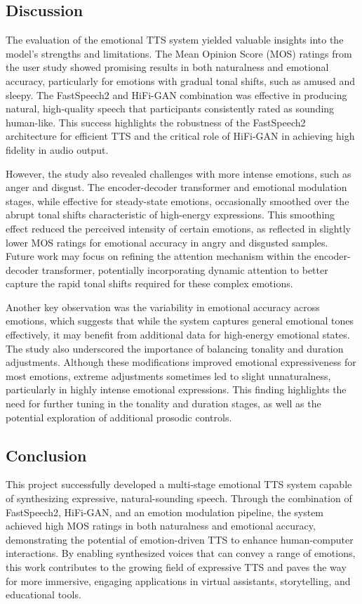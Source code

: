 \subsection{Discussion}
The evaluation of the emotional TTS system yielded valuable insights into the model’s strengths and limitations. The Mean Opinion Score (MOS) ratings from the user study showed promising results in both naturalness and emotional accuracy, particularly for emotions with gradual tonal shifts, such as amused and sleepy. The FastSpeech2 and HiFi-GAN combination was effective in producing natural, high-quality speech that participants consistently rated as sounding human-like. This success highlights the robustness of the FastSpeech2 architecture for efficient TTS and the critical role of HiFi-GAN in achieving high fidelity in audio output.

However, the study also revealed challenges with more intense emotions, such as anger and disgust. The encoder-decoder transformer and emotional modulation stages, while effective for steady-state emotions, occasionally smoothed over the abrupt tonal shifts characteristic of high-energy expressions. This smoothing effect reduced the perceived intensity of certain emotions, as reflected in slightly lower MOS ratings for emotional accuracy in angry and disgusted samples. Future work may focus on refining the attention mechanism within the encoder-decoder transformer, potentially incorporating dynamic attention to better capture the rapid tonal shifts required for these complex emotions.

Another key observation was the variability in emotional accuracy across emotions, which suggests that while the system captures general emotional tones effectively, it may benefit from additional data for high-energy emotional states. The study also underscored the importance of balancing tonality and duration adjustments. Although these modifications improved emotional expressiveness for most emotions, extreme adjustments sometimes led to slight unnaturalness, particularly in highly intense emotional expressions. This finding highlights the need for further tuning in the tonality and duration stages, as well as the potential exploration of additional prosodic controls.

\subsection{Conclusion}
This project successfully developed a multi-stage emotional TTS system capable of synthesizing expressive, natural-sounding speech. Through the combination of FastSpeech2, HiFi-GAN, and an emotion modulation pipeline, the system achieved high MOS ratings in both naturalness and emotional accuracy, demonstrating the potential of emotion-driven TTS to enhance human-computer interactions. By enabling synthesized voices that can convey a range of emotions, this work contributes to the growing field of expressive TTS and paves the way for more immersive, engaging applications in virtual assistants, storytelling, and educational tools.

